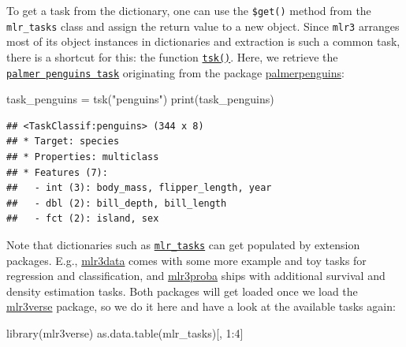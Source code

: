 \documentclass[
]{scrbook}
\newenvironment{Shaded}{\begin{snugshade}}{\end{snugshade}}
\newcommand{\DecValTok}[1]{\textcolor[rgb]{0.00,0.00,0.81}{#1}}
\newcommand{\FunctionTok}[1]{\textcolor[rgb]{0.00,0.00,0.00}{#1}}
\newcommand{\NormalTok}[1]{#1}
\newcommand{\OtherTok}[1]{\textcolor[rgb]{0.56,0.35,0.01}{#1}}
\newcommand{\SpecialCharTok}[1]{\textcolor[rgb]{0.00,0.00,0.00}{#1}}
\newcommand{\StringTok}[1]{\textcolor[rgb]{0.31,0.60,0.02}{#1}}
\renewenvironment{Shaded} {\begin{snugshade}\small} {\end{snugshade}}
\begin{document}
To get a task from the dictionary, one can use the \texttt{\$get()} method from the \texttt{mlr\_tasks} class and assign the return value to a new object.
Since \texttt{mlr3} arranges most of its object instances in dictionaries and extraction is such a common task, there is a shortcut for this: the function \href{https://mlr3.mlr-org.com/reference/mlr_sugar.html}{\texttt{tsk()}}.
Here, we retrieve the \href{https://mlr3.mlr-org.com/reference/mlr_tasks_penguins.html}{\texttt{palmer\ penguins\ task}} originating from the package \href{https://cran.r-project.org/package=palmerpenguins}{palmerpenguins}:

\begin{Shaded}
\begin{Highlighting}[]
\NormalTok{task\_penguins }\OtherTok{=} \FunctionTok{tsk}\NormalTok{(}\StringTok{"penguins"}\NormalTok{)}
\FunctionTok{print}\NormalTok{(task\_penguins)}
\end{Highlighting}
\end{Shaded}

\begin{verbatim}
## <TaskClassif:penguins> (344 x 8)
## * Target: species
## * Properties: multiclass
## * Features (7):
##   - int (3): body_mass, flipper_length, year
##   - dbl (2): bill_depth, bill_length
##   - fct (2): island, sex
\end{verbatim}

Note that dictionaries such as \href{https://mlr3.mlr-org.com/reference/mlr_tasks.html}{\texttt{mlr\_tasks}} can get populated by extension packages.
E.g., \href{https://mlr3data.mlr-org.com}{mlr3data} comes with some more example and toy tasks for regression and classification, and \href{https://mlr3proba.mlr-org.com}{mlr3proba} ships with additional survival and density estimation tasks.
Both packages will get loaded once we load the \href{https://mlr3verse.mlr-org.com}{mlr3verse} package, so we do it here and have a look at the available tasks again:

\begin{Shaded}
\begin{Highlighting}[]
\FunctionTok{library}\NormalTok{(mlr3verse)}
\FunctionTok{as.data.table}\NormalTok{(mlr\_tasks)[, }\DecValTok{1}\SpecialCharTok{:}\DecValTok{4}\NormalTok{]}
\end{Highlighting}
\end{Shaded}
\end{document}

